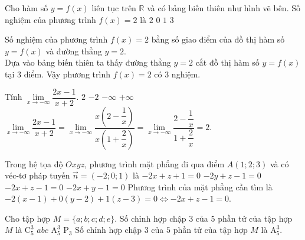 \begin{ex}%
 \immini
 {
 Cho hàm số $y=f(x)$ liên tục trên $\mathbb{R}$ và có bảng biến thiên như hình vẽ bên. Số nghiệm của phương trình $f(x)=2$ là
 \choice
  {$2$}
  {$0$}
  {$1$}
  {\True $3$}
 }
 {
 }
 \loigiai
  {
  Số nghiệm của phương trình $f(x) = 2$ bằng số giao điểm của đồ thị hàm số $y=f(x)$ và đường thẳng $y=2$.\\
  Dựa vào bảng biến thiên ta thấy đường thẳng $y=2$ cắt đồ thị hàm số $y=f(x)$ tại $3$ điểm. Vậy phương trình $f(x)=2$ có $3$ nghiệm.
  }
\end{ex}


\begin{ex}%
 Tính $\lim\limits_{x\to -\infty}\dfrac{2x-1}{x+2}$.
 \choice
  {\True $2$}
  {$-2$}
  {$-\infty$}
  {$+\infty$}
 \loigiai
  {
  $\lim\limits_{x\to -\infty}\dfrac{2x-1}{x+2} = \lim\limits_{x\to -\infty} \dfrac{x \left(2 - \dfrac{1}{x}\right)}{x \left(1+\dfrac{2}{x}\right)} = \lim\limits_{x\to -\infty}\dfrac{2-\dfrac{1}{x}}{1+\dfrac{2}{x}} = 2$.
  }
\end{ex}


\begin{ex}%
 Trong hệ tọa độ $Oxyz$, phương trình mặt phẳng đi qua điểm $A(1;2;3)$ và có véc-tơ pháp tuyến $\vec{n}=(-2;0;1)$ là
 \choice
  {$-2x+z+1=0$}
  {$-2y+z-1=0$}
  {\True $-2x+z-1=0$}
  {$-2x+y-1=0$}
 \loigiai
  {
  Phương trình của mặt phẳng cần tìm là $-2(x-1)+0(y-2)+1(z-3)=0 \Leftrightarrow -2x+z-1=0$.
  }
\end{ex}


\begin{ex}%
 Cho tập hợp $M = \{a;b;c;d;e\}$. Số chỉnh hợp chập $3$ của $5$ phần tử của tập hợp $M$ là
 \choice
  {$\mathrm{C}_5^3$}
  {$abc$}
  {\True $\mathrm{A}_5^3$}
  {$\mathrm{P}_3$}
 \loigiai
  {
  Số chỉnh hợp chập $3$ của $5$ phần tử của tập hợp $M$ là $\mathrm{A}_5^3$.
  }
\end{ex}


